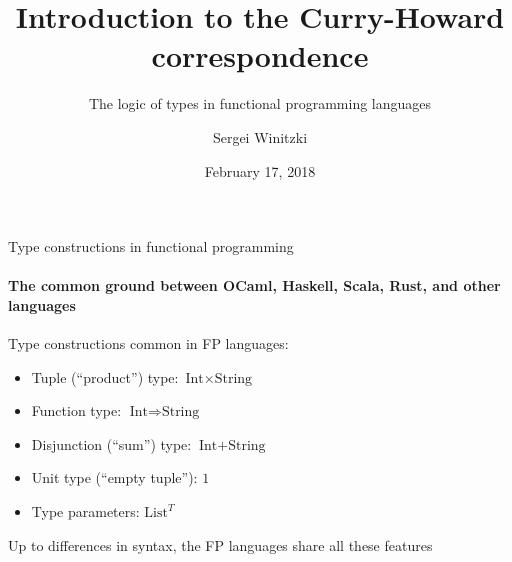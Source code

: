 \documentclass[english]{beamer}
\title[Introduction to Curry-Howard]{Introduction to the Curry-Howard
correspondence}
\subtitle{The logic of types in functional programming languages}
\author{Sergei Winitzki}
\date{February 17, 2018}
\institute[ABTB]{Academy by the Bay}
\begin{document}
\frame{\titlepage}
\begin{frame}{Type constructions in functional programming}


\framesubtitle{The common ground between OCaml, Haskell, Scala, Rust, and other
languages}

Type constructions common in FP languages:
\begin{itemize}
\item Tuple (``product'') type: $\text{Int}\times\text{String}$
\item Function type: $\text{Int}\Rightarrow\text{String}$
\item Disjunction (``sum'') type: $\text{Int}+\text{String}$
\item Unit type (``empty tuple''): $1$
\item Type parameters: $\text{List}^{T}$
\end{itemize}
Up to differences in syntax, the FP languages share all these features
\end{frame}
\end{document}
